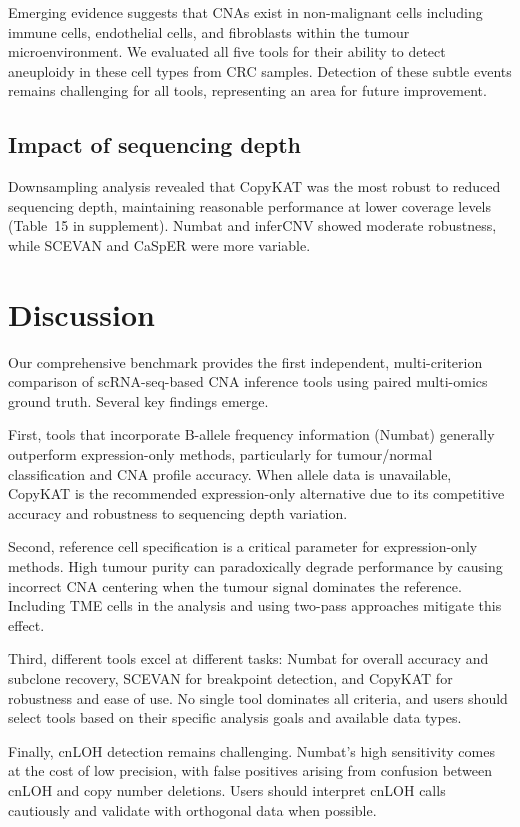 \documentclass[11pt]{article}
\begin{document}
Emerging evidence suggests that CNAs exist in non-malignant cells including immune cells, endothelial cells, and fibroblasts within the tumour microenvironment. We evaluated all five tools for their ability to detect aneuploidy in these cell types from CRC samples. Detection of these subtle events remains challenging for all tools, representing an area for future improvement.

\subsection{Impact of sequencing depth}

Downsampling analysis revealed that CopyKAT was the most robust to reduced sequencing depth, maintaining reasonable performance at lower coverage levels (Table~15 in supplement). Numbat and inferCNV showed moderate robustness, while SCEVAN and CaSpER were more variable.

\section{Discussion}

Our comprehensive benchmark provides the first independent, multi-criterion comparison of scRNA-seq-based CNA inference tools using paired multi-omics ground truth. Several key findings emerge.

First, tools that incorporate B-allele frequency information (Numbat) generally outperform expression-only methods, particularly for tumour/normal classification and CNA profile accuracy. When allele data is unavailable, CopyKAT is the recommended expression-only alternative due to its competitive accuracy and robustness to sequencing depth variation.

Second, reference cell specification is a critical parameter for expression-only methods. High tumour purity can paradoxically degrade performance by causing incorrect CNA centering when the tumour signal dominates the reference. Including TME cells in the analysis and using two-pass approaches mitigate this effect.

Third, different tools excel at different tasks: Numbat for overall accuracy and subclone recovery, SCEVAN for breakpoint detection, and CopyKAT for robustness and ease of use. No single tool dominates all criteria, and users should select tools based on their specific analysis goals and available data types.

Finally, cnLOH detection remains challenging. Numbat's high sensitivity comes at the cost of low precision, with false positives arising from confusion between cnLOH and copy number deletions. Users should interpret cnLOH calls cautiously and validate with orthogonal data when possible.
\end{document}
